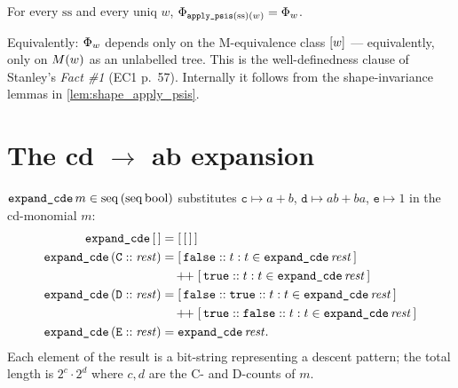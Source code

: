 \begin{theorem}
  \label{thm:phi_w_apply_psis}
  \rocqok
  For every $\mathrm{ss}$ and every uniq $w$,
  $\Phi_{\texttt{apply\_psis}(\mathrm{ss})(w)} = \Phi_{w}$.

  Equivalently: $\Phi_{w}$ depends only on the M-equivalence class
  $[w]$ — equivalently, only on $M(w)$ as an unlabelled
  tree.  This is the well-definedness clause of Stanley's
  \emph{Fact \#1} (EC1 p.~57).  Internally it follows from the
  shape-invariance lemmas in
  \cref{lem:shape_apply_psis}.
\end{theorem}

\section{The cd $\to$ ab expansion}

\begin{definition}
  \label{def:expand_cde}
  \rocqok
  $\texttt{expand\_cde}\,m \in \mathrm{seq}\,(\mathrm{seq}\,\mathrm{bool})$
  substitutes $\mathtt{c} \mapsto a + b$, $\mathtt{d} \mapsto ab + ba$,
  $\mathtt{e} \mapsto 1$ in the cd-monomial $m$:
  \begin{align*}
    \texttt{expand\_cde}\,[\,] &= [\,[\,]\,]\\
    \texttt{expand\_cde}\,(\mathtt{C} :: \mathit{rest}) &=
      [\,\mathtt{false} :: t : t \in \texttt{expand\_cde}\,\mathit{rest}\,]\\
    &\quad +\!\!+\;
      [\,\mathtt{true} :: t : t \in \texttt{expand\_cde}\,\mathit{rest}\,]\\
    \texttt{expand\_cde}\,(\mathtt{D} :: \mathit{rest}) &=
      [\,\mathtt{false}::\mathtt{true}::t : t \in \texttt{expand\_cde}\,\mathit{rest}\,]\\
    &\quad +\!\!+\;
      [\,\mathtt{true}::\mathtt{false}::t : t \in \texttt{expand\_cde}\,\mathit{rest}\,]\\
    \texttt{expand\_cde}\,(\mathtt{E} :: \mathit{rest}) &=
      \texttt{expand\_cde}\,\mathit{rest}.
  \end{align*}
  Each element of the result is a bit-string representing a descent
  pattern; the total length is $2^{c} \cdot 2^{d}$ where $c, d$ are
  the C- and D-counts of $m$.
\end{definition}

